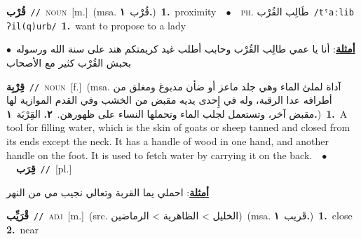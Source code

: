 \documentclass[10pt,a4paper,twoside]{article} %
\begin{document}
\begin{multicols}{2}
{\setlength\topsep{0pt}\textbf{\foreignlanguage{arabic}{قُرْب}}\ {\color{gray}\texttt{//}\color{black}}\ \textsc{noun}\ [m.]\ \color{gray}(msa. \foreignlanguage{arabic}{قُرْب}~\foreignlanguage{arabic}{\textbf{١.}})\color{black}\ \textbf{1.}~proximity\ \ $\bullet$\ \ \textsc{ph.} \color{gray} \foreignlanguage{arabic}{طَالِب القُرْب}\color{black}\ {\color{gray}\texttt{/{\sffamily tˤaːlib ʔil(q)urb}/}\color{black}}\ \textbf{1.}~want to propose to a lady\  \begin{flushright}\color{gray}\foreignlanguage{arabic}{\textbf{\underline{\foreignlanguage{arabic}{أمثلة}}}: أنا يا عمي طالِب القُرْب وحابب أطلب غيد كريمتكم هند على سنة الله ورسوله\ $\bullet$\ \  بحبش القُرْب كثير مع الأصحاب}\end{flushright}\color{black}} \vspace{2mm}

{\setlength\topsep{0pt}\textbf{\foreignlanguage{arabic}{قِرْبِة}}\ {\color{gray}\texttt{//}\color{black}}\ \textsc{noun}\ [f.]\ \color{gray}(msa. \foreignlanguage{arabic}{آداة لملئ الماء وهي جلد ماعز أو ضأن مدبوغ ومغلق من أطرافه عدا الرقبة، وله في إِحدى يديه مقبض من الخشب وفي القدم الموازية لها مقبض آخر، وتستعمل لجلب الماء وتحملها النساء على ظهورهن.}~\foreignlanguage{arabic}{\textbf{٢.}}  \foreignlanguage{arabic}{القِرْبَة}~\foreignlanguage{arabic}{\textbf{١.}})\color{black}\ \textbf{1.}~A tool for filling water, which is the skin of goats or sheep tanned and closed from its ends except the neck. It has a handle of wood in one hand, and another handle on the foot. It is used to fetch water by carrying it on the back.\ \ $\bullet$\ \ \setlength\topsep{0pt}\textbf{\foreignlanguage{arabic}{قِرَب}}\ {\color{gray}\texttt{//}\color{black}}\ [pl.]\  \begin{flushright}\color{gray}\foreignlanguage{arabic}{\textbf{\underline{\foreignlanguage{arabic}{أمثلة}}}: احملي يما القربة وتعالي نجيب مي من النهر}\end{flushright}\color{black}} \vspace{2mm}

{\setlength\topsep{0pt}\textbf{\foreignlanguage{arabic}{قْرَيِّب}}\ {\color{gray}\texttt{//}\color{black}}\ \textsc{adj}\ [m.]\ (src. \color{gray}\foreignlanguage{arabic}{الخليل > الظاهرية > الرماضين}\color{black})\ \color{gray}(msa. \foreignlanguage{arabic}{قَريب}~\foreignlanguage{arabic}{\textbf{١.}})\color{black}\ \textbf{1.}~close  \textbf{2.}~near\ } \vspace{2mm}


\end{multicols}
\end{document}
